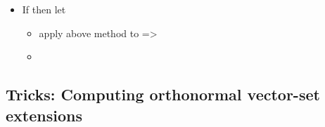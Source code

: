 \begin{itemize}
\begin{itemize}
\begin{itemize}
\begin{itemize}
\begin{itemize}
        \item
          Solve for unit-vector  s.t. it is
          orthogonal to 
        \item
          Then solve for unit-vector  s.t. it is
          orthogonal to 
        \item
          And so on\ldots{} {[}{[}\#Tricks Computing orthonormal
          vector-set extensions\textbar see this for better
          methods{]}{]}
        \end{itemize}
      \item
        is {[}{[}tutorial 1\#Orthogonality
        concepts\textbar orthogonal{]}{]} so 
      \end{itemize}
    \item
      ,
      \textbf{AND DONE!!!}
    \end{itemize}
  \item
    If  then let 

    \begin{itemize}
    
    \item
      apply above method to  =\textgreater{}
    \item
    \end{itemize}
  \end{itemize}
\end{itemize}

\subsection*{Tricks: Computing orthonormal vector-set
extensions}


